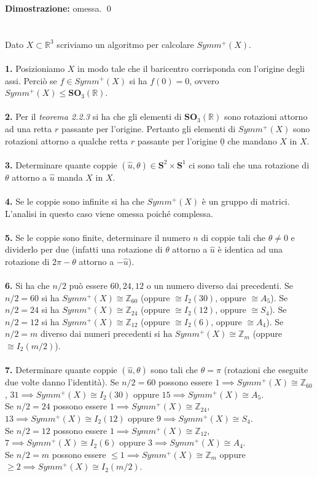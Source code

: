 \documentclass{article}
\begin{document}
\textbf{Dimostrazione:} omessa. \qed \\ \\ \\
Dato $X \subset \mathbb{R}^3$ scriviamo un algoritmo per calcolare $Symm^+(X)$. \\ \\
\textbf{1.} Posizioniamo $X$ in modo tale che il baricentro corrisponda con l'origine degli assi. Perciò se $f \in Symm^+(X)$ si ha $f(0) = 0$, ovvero $Symm^+(X) \leq \mathbf{SO}_3(\mathbb{R})$. \\ \\
\textbf{2.} Per il \textit{teorema 2.2.3} si ha che gli elementi di $\mathbf{SO}_3(\mathbb{R})$ sono rotazioni attorno ad una retta $r$ passante per l'origine. Pertanto gli elementi di $Symm^+(X)$ sono rotazioni attorno a qualche retta $r$ passante per l'origine $\underline{0}$ che mandano $X$ in $X$. \\ \\
\textbf{3.} Determinare quante coppie $(\hat{u}, \theta) \in \mathbf{S}^2 \times \mathbf{S}^1$ ci sono tali che una rotazione di $\theta$ attorno a $\hat{u}$ manda $X$ in $X$. \\ \\
\textbf{4.} Se le coppie sono infinite si ha che $Symm^+(X)$ è un gruppo di matrici. L'analisi in questo caso viene omessa poiché complessa. \\ \\
\textbf{5.} Se le coppie sono finite, determinare il numero $n$ di coppie tali che $\theta \neq 0$ e dividerlo per due (infatti una rotazione di $\theta$ attorno a $\hat{u}$ è identica ad una rotazione di $2\pi - \theta$ attorno a $-\hat{u}$). \\ \\
\textbf{6.} Si ha che $n/2$ può essere $60, 24, 12$ o un numero diverso dai precedenti. Se $n/2 = 60$ si ha $Symm^+(X) \cong \mathbb{Z}_{60}$ (oppure $\cong I_2(30)$, oppure $\cong A_5$). Se $n/2 = 24$ si ha $Symm^+(X) \cong \mathbb{Z}_{24}$ (oppure $\cong I_2(12)$, oppure $\cong S_4$). Se $n/2 = 12$ si ha $Symm^+(X) \cong \mathbb{Z}_{12}$ (oppure $\cong I_2(6)$, oppure $\cong A_4$). Se $n/2 = m$ diverso dai numeri precedenti si ha $Symm^+(X) \cong \mathbb{Z}_m$ (oppure $\cong I_2(m/2)$). \\ \\
\textbf{7.} Determinare quante coppie $(\hat{u}, \theta)$ sono tali che $\theta = \pi$ (rotazioni che eseguite due volte danno l'identità). Se $n/2 = 60$ possono essere $1 \implies Symm^+(X) \cong \mathbb{Z}_{60}$, $31 \implies Symm^+(X) \cong I_2(30)$ oppure $15 \implies Symm^+(X) \cong A_5$. \\
Se $n/2 = 24$ possono essere $1 \implies Symm^+(X) \cong \mathbb{Z}_{24}$, $13 \implies Symm^+(X) \cong I_2(12)$ oppure $9 \implies Symm^+(X) \cong S_4$. \\
Se $n/2 = 12$ possono essere $1 \implies Symm^+(X) \cong \mathbb{Z}_{12}$, $7 \implies Symm^+(X) \cong I_2(6)$ oppure $3 \implies Symm^+(X) \cong A_4$. \\
Se $n/2 = m$ possono essere $\leq 1 \implies Symm^+(X) \cong \mathbb{Z}_m$ oppure $\geq 2 \implies Symm^+(X) \cong I_2(m/2)$.
\end{document}
